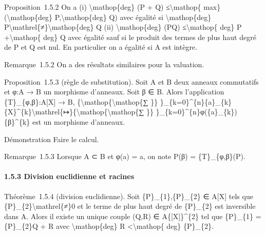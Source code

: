 \documentclass[]{article}
\begin{document}
Proposition~1.5.2 On a (i) \textbackslash{}mathop\{deg\} (P + Q)
≤\textbackslash{}mathop\{ max\}(\textbackslash{}mathop\{deg\}
P,\textbackslash{}mathop\{deg\} Q) avec égalité si
\textbackslash{}mathop\{deg\}
P\textbackslash{}mathrel\{≠\}\textbackslash{}mathop\{deg\} Q (ii)
\textbackslash{}mathop\{deg\} (PQ) ≤\textbackslash{}mathop\{ deg\} P
+\textbackslash{}mathop\{ deg\} Q avec égalité sauf si le produit des
termes de plus haut degré de P et Q est nul. En particulier on a égalité
si A est intègre.

Remarque~1.5.2 On a des résultats similaires pour la valuation.

Proposition~1.5.3 (règle de substitution). Soit A et B deux anneaux
commutatifs et φ:A → B un morphisme d'anneaux. Soit β ∈ B. Alors
l'application \{T\}\_\{φ,β\}:A{[}X{]} → B,
\{\textbackslash{}mathop\{\textbackslash{}mathop\{∑ \}\}
\}\_\{k=0\}\^{}\{n\}\{a\}\_\{k\}\{X\}\^{}\{k\}\textbackslash{}mathrel\{↦\}\{\textbackslash{}mathop\{\textbackslash{}mathop\{∑
\}\} \}\_\{k=0\}\^{}\{n\}φ(\{a\}\_\{k\})\{β\}\^{}\{k\} est un morphisme
d'anneaux.

Démonstration Faire le calcul.

Remarque~1.5.3 Lorsque A ⊂ B et φ(a) = a, on note P(β) =
\{T\}\_\{φ,β\}(P).

\paragraph{1.5.3 Division euclidienne et racines}

Théorème~1.5.4 (division euclidienne). Soit \{P\}\_\{1\},\{P\}\_\{2\} ∈
A{[}X{]} tels que \{P\}\_\{2\}\textbackslash{}mathrel\{≠\}0 et le terme
de plus haut degré de \{P\}\_\{2\} est inversible dans A. Alors il
existe un unique couple (Q,R) ∈ A\{{[}X{]}\}\^{}\{2\} tel que
\{P\}\_\{1\} = \{P\}\_\{2\}Q + R avec \textbackslash{}mathop\{deg\} R
\textless{}\textbackslash{}mathop\{ deg\} \{P\}\_\{2\}.
\end{document}
